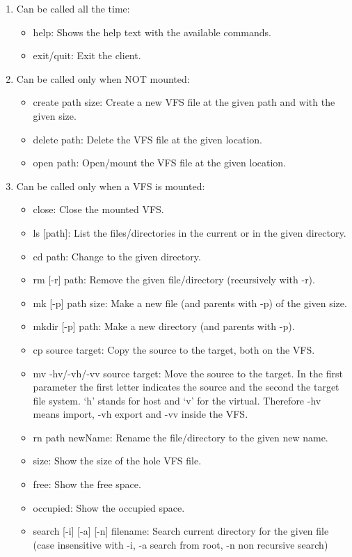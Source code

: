 \documentclass[a4paper,12pt]{article}
\begin{document}
\begin{enumerate}
	\item Can be called all the time:
	\begin{itemize}
		\item help: Shows the help text with the available commands.
		\item exit/quit: Exit the client.
	\end{itemize}
	\item Can be called only when NOT mounted:
	\begin{itemize}
		\item create path size: Create a new VFS file at the given path and with the given size.
		\item delete path: Delete the VFS file at the given location.
		\item open path: Open/mount the VFS file at the given location.
	\end{itemize}
	\item Can be called only when a VFS is mounted:
	\begin{itemize}
		\item close: Close the mounted VFS.
		\item ls [path]: List the files/directories in the current or in the given directory.
		\item cd path: Change to the given directory.
		\item rm [-r] path: Remove the given file/directory (recursively with -r).
		\item mk [-p] path size: Make a new file (and parents with -p) of the given size.
		\item mkdir [-p] path: Make a new directory (and parents with -p).
		\item cp source target: Copy the source to the target, both on the VFS.
		\item mv -hv/-vh/-vv source target: Move the source to the target. In the first parameter the first letter indicates the source and the second the target file system.  ‘h’ stands for host and ‘v’ for the virtual. Therefore -hv means import, -vh export and -vv inside the VFS.
		\item rn path newName: Rename the file/directory to the given new name.
		\item size: Show the size of the hole VFS file.
		\item free: Show the free space.
		\item occupied: Show the occupied space.
		\item search [-i] [-a] [-n] filename: Search current directory for the given file (case insensitive with -i, -a search from root, -n non recursive search)
	\end{itemize}
\end{enumerate}
\end{document}
